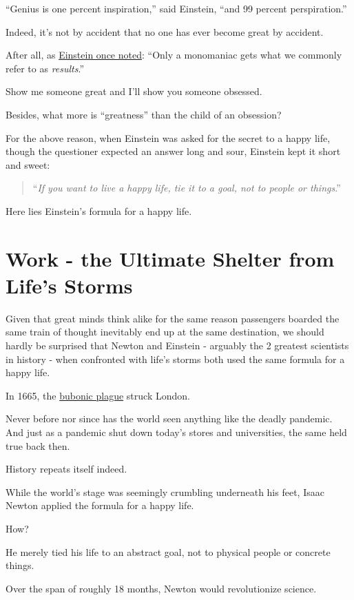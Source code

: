 \documentclass{book}
\numberwithin{equation}{section}
\begin{document}
%
``Genius is one percent inspiration,'' said Einstein, ``and 99 percent perspiration.''

Indeed, it's not by accident that no one has ever become great by accident.

After all, as \href{https://www.newyorker.com/magazine/1947/11/22/the-great-foreigner}{Einstein once noted}: ``Only a monomaniac gets what we commonly refer to as \textit{results}.''

%
Show me someone great and I'll show you someone obsessed.

Besides, what more is ``greatness'' than the child of an obsession?

%
For the above reason, when Einstein was asked for the secret to a happy life, though the questioner expected an answer long and sour, Einstein kept it short and sweet:
\begin{quotation}
    ``\textit{If you want to live a happy life, tie it to a goal, not to people or things}.''
\end{quotation}
Here lies Einstein's formula for a happy life.

\section{Work - the Ultimate Shelter from Life's Storms}
Given that great minds think alike for the same reason passengers boarded the same train of thought inevitably end up at the same destination, we should hardly be surprised that Newton and Einstein - arguably the 2 greatest scientists in history - when confronted with life's storms both used the same formula for a happy life.

%
In 1665, the \href{https://www.historic-uk.com/HistoryUK/HistoryofEngland/The-Great-Plague/}{bubonic plague} struck London.

Never before nor since has the world seen anything like the deadly pandemic. And just as a pandemic shut down today's stores and universities, the same held true back then.

History repeats itself indeed.

%
While the world's stage was seemingly crumbling underneath his feet, Isaac Newton applied the formula for a happy life.

How?

He merely tied his life to an abstract goal, not to physical people or concrete things.

Over the span of roughly 18 months, Newton would revolutionize science.
\end{document}
